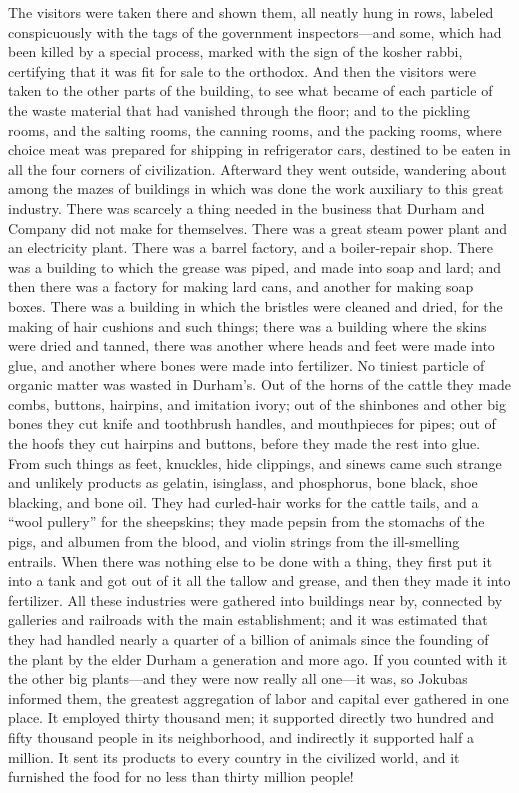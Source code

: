\documentclass[
]{article}
\begin{document}
The visitors were taken there and shown them, all neatly hung in rows, labeled conspicuously with the tags of the government inspectors---and some, which had been killed by a special process, marked with the sign of the kosher rabbi, certifying that it was fit for sale to the orthodox. And then the visitors were taken to the other parts of the building, to see what became of each particle of the waste material that had vanished through the floor; and to the pickling rooms, and the salting rooms, the canning rooms, and the packing rooms, where choice meat was prepared for shipping in refrigerator cars, destined to be eaten in all the four corners of civilization. Afterward they went outside, wandering about among the mazes of buildings in which was done the work auxiliary to this great industry. There was scarcely a thing needed in the business that Durham and Company did not make for themselves. There was a great steam power plant and an electricity plant. There was a barrel factory, and a boiler-repair shop. There was a building to which the grease was piped, and made into soap and lard; and then there was a factory for making lard cans, and another for making soap boxes. There was a building in which the bristles were cleaned and dried, for the making of hair cushions and such things; there was a building where the skins were dried and tanned, there was another where heads and feet were made into glue, and another where bones were made into fertilizer. No tiniest particle of organic matter was wasted in Durham's. Out of the horns of the cattle they made combs, buttons, hairpins, and imitation ivory; out of the shinbones and other big bones they cut knife and toothbrush handles, and mouthpieces for pipes; out of the hoofs they cut hairpins and buttons, before they made the rest into glue. From such things as feet, knuckles, hide clippings, and sinews came such strange and unlikely products as gelatin, isinglass, and phosphorus, bone black, shoe blacking, and bone oil. They had curled-hair works for the cattle tails, and a ``wool pullery'' for the sheepskins; they made pepsin from the stomachs of the pigs, and albumen from the blood, and violin strings from the ill-smelling entrails. When there was nothing else to be done with a thing, they first put it into a tank and got out of it all the tallow and grease, and then they made it into fertilizer. All these industries were gathered into buildings near by, connected by galleries and railroads with the main establishment; and it was estimated that they had handled nearly a quarter of a billion of animals since the founding of the plant by the elder Durham a generation and more ago. If you counted with it the other big plants---and they were now really all one---it was, so Jokubas informed them, the greatest aggregation of labor and capital ever gathered in one place. It employed thirty thousand men; it supported directly two hundred and fifty thousand people in its neighborhood, and indirectly it supported half a million. It sent its products to every country in the civilized world, and it furnished the food for no less than thirty million people!
\end{document}
